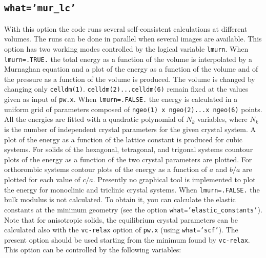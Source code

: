 \documentclass[12pt,a4paper]{article}
\begin{document}
\subsection{\texttt{what='mur\_lc'}}
With this option the code runs several self-consistent calculations
at different volumes. The runs can be done in parallel when several images 
are available. This option has two working modes controlled by the 
logical variable \texttt{lmurn}. When \texttt{lmurn=.TRUE.} the total energy as 
a function of the volume is interpolated by a Murnaghan equation and 
a plot of the energy as a function of the volume and of the pressure 
as a function of the volume is produced. The volume is changed by 
changing only \texttt{celldm(1)}. \texttt{celldm(2)...celldm(6)} remain fixed
at the values given as input of \texttt{pw.x}.
When \texttt{lmurn=.FALSE.} the energy is calculated in a uniform
grid of parameters composed of \texttt{ngeo(1) x ngeo(2)...x ngeo(6)} points.
All the energies are fitted with a quadratic polynomial of
$N_k$ variables, where $N_k$ is the number of independent crystal
parameters for the given crystal system. A plot of the energy as 
a function of the lattice constant is produced for cubic systems.
For solids of the hexagonal, tetragonal, and trigonal systems
countour plots of the energy as a function of the two crystal parameters
are plotted. For orthorombic systems contour plots of the energy as a function
of $a$ and $b/a$ are plotted for each value of $c/a$. 
Presently no graphical tool is implemented to plot the energy
for monoclinic and triclinic crystal systems. 
When \texttt{lmurn=.FALSE.} the bulk modulus
is not calculated. To obtain it, you can calculate the elastic constants at the
minimum geometry (see the option \texttt{what='elastic\_constants'}). 
Note that for anisotropic solids, the equilibrium crystal parameters
can be calculated also with the \texttt{vc-relax} option of \texttt{pw.x} 
(using \texttt{what='scf'}).
The present option should be used starting from the minimum found by
\texttt{vc-relax}. \\
This option can be controlled by the following variables:
\end{document}
